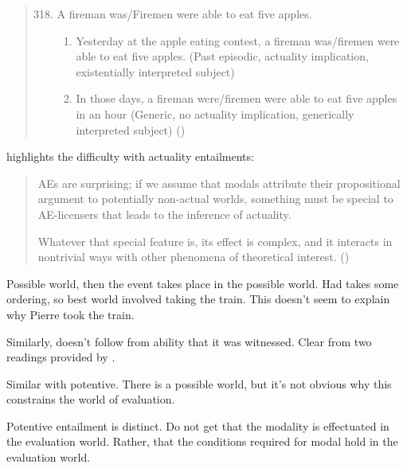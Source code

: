 \begin{note}
\begin{quote}
    \begin{enumerate}[label=(\arabic*), ref=(\arabic*)]
      \setcounter{enumi}{317}
    \item A fireman was/Firemen were able to eat five apples.
      \begin{enumerate}[label=\alph*., ref=\alph*.]
      \item Yesterday at the apple eating contest, a fireman was/firemen were able to eat five apples. (Past episodic, actuality implication, existentially interpreted subject)
      \item In those days, a fireman were/firemen were able to eat five apples in an hour (Generic, no actuality implication, generically interpreted subject)\nolinebreak
        \mbox{}\hfill\mbox{(\citeauthor[172--173]{Bhatt:1999wq})}
      \end{enumerate}
    \end{enumerate}
  \end{quote}

  \citeauthor{Alxatib:2019wf} highlights the difficulty with actuality entailments:

  \begin{quote}
    AEs are surprising; if we assume that modals attribute their propositional argument to potentially non-actual worlds, something must be special to AE-licensers that leads to the inference of actuality.

    Whatever that special feature is, its effect is complex, and it interacts in nontrivial ways with other phenomena of theoretical interest.\nolinebreak
    \mbox{}\hfill\mbox{(\citeyear[701]{Alxatib:2019wf})}
  \end{quote}

  Possible world, then the event takes place in the possible world.
  Had takes some ordering, so best world involved taking the train.
  This doesn't seem to explain why Pierre took the train.

  {\color{red} Similarly, doesn't follow from ability that it was witnessed.}
  Clear from two readings provided by \citeauthor{Bhatt:1999wq}.

  Similar with potentive.
  There is a possible world, but it's not obvious why this constrains the world of evaluation.

  Potentive entailment is distinct.
  Do not get that the modality is effectuated in the evaluation world.
  Rather, that the conditions required for modal hold in the evaluation world.
\end{note}

